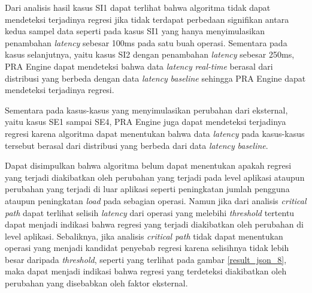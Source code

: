 Dari analisis hasil kasus SI1 dapat terlihat bahwa algoritma tidak dapat mendeteksi terjadinya regresi jika tidak terdapat perbedaan signifikan antara kedua sampel data seperti pada kasus SI1 yang hanya menyimulasikan penambahan \textit{latency} sebesar 100ms pada satu buah operasi. Sementara pada kasus selanjutnya, yaitu kasus SI2 dengan penambahan \textit{latency} sebesar 250ms, PRA Engine dapat mendeteksi bahwa data \textit{latency} \textit{real-time} berasal dari distribusi yang berbeda dengan data \textit{latency} \textit{baseline} sehingga PRA Engine dapat mendeteksi terjadinya regresi.

Sementara pada kasus-kasus yang menyimulasikan perubahan dari eksternal, yaitu kasus SE1 sampai SE4, PRA Engine juga dapat mendeteksi terjadinya regresi karena algoritma dapat menentukan bahwa data \textit{latency} pada kasus-kasus tersebut berasal dari distribusi yang berbeda dari data \textit{latency} \textit{baseline}.

Dapat disimpulkan bahwa algoritma belum dapat menentukan apakah regresi yang terjadi diakibatkan oleh perubahan yang terjadi pada level aplikasi ataupun perubahan yang terjadi di luar aplikasi seperti peningkatan jumlah pengguna ataupun peningkatan \textit{load} pada sebagian operasi. Namun jika dari analisis \textit{critical path} dapat terlihat selisih \textit{latency} dari operasi yang melebihi \textit{threshold} tertentu dapat menjadi indikasi bahwa regresi yang terjadi diakibatkan oleh perubahan di level aplikasi. Sebaliknya, jika analisis \textit{critical path} tidak dapat menentukan operasi yang menjadi kandidat penyebab regresi karena selisihnya tidak lebih besar daripada \textit{threshold}, seperti yang terlihat pada gambar \ref{result_json_8}, maka dapat menjadi indikasi bahwa regresi yang terdeteksi diakibatkan oleh perubahan yang disebabkan oleh faktor eksternal.
